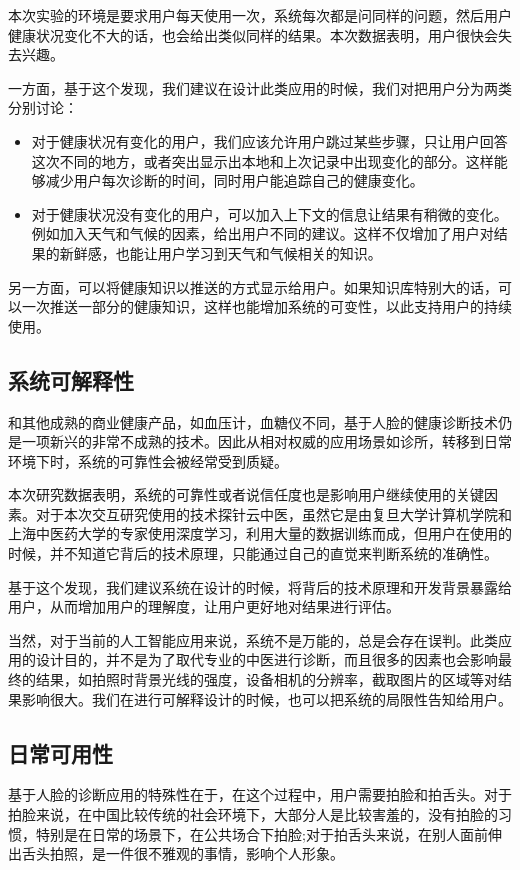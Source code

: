本次实验的环境是要求用户每天使用一次，系统每次都是问同样的问题，然后用户健康状况变化不大的话，也会给出类似同样的结果。本次数据表明，用户很快会失去兴趣。

一方面，基于这个发现，我们建议在设计此类应用的时候，我们对把用户分为两类分别讨论：

\begin{itemize}

    \item 对于健康状况有变化的用户，我们应该允许用户跳过某些步骤，只让用户回答这次不同的地方，或者突出显示出本地和上次记录中出现变化的部分。这样能够减少用户每次诊断的时间，同时用户能追踪自己的健康变化。

    \item 对于健康状况没有变化的用户，可以加入上下文的信息让结果有稍微的变化。例如加入天气和气候的因素，给出用户不同的建议。这样不仅增加了用户对结果的新鲜感，也能让用户学习到天气和气候相关的知识。

\end{itemize}

另一方面，可以将健康知识以推送的方式显示给用户。如果知识库特别大的话，可以一次推送一部分的健康知识，这样也能增加系统的可变性，以此支持用户的持续使用。

\subsection{系统可解释性}

和其他成熟的商业健康产品，如血压计，血糖仪不同，基于人脸的健康诊断技术仍是一项新兴的非常不成熟的技术。因此从相对权威的应用场景如诊所，转移到日常环境下时，系统的可靠性会被经常受到质疑。

本次研究数据表明，系统的可靠性或者说信任度也是影响用户继续使用的关键因素。对于本次交互研究使用的技术探针云中医，虽然它是由复旦大学计算机学院和上海中医药大学的专家使用深度学习，利用大量的数据训练而成，但用户在使用的时候，并不知道它背后的技术原理，只能通过自己的直觉来判断系统的准确性。

基于这个发现，我们建议系统在设计的时候，将背后的技术原理和开发背景暴露给用户，从而增加用户的理解度，让用户更好地对结果进行评估。

当然，对于当前的人工智能应用来说，系统不是万能的，总是会存在误判。此类应用的设计目的，并不是为了取代专业的中医进行诊断，而且很多的因素也会影响最终的结果，如拍照时背景光线的强度，设备相机的分辨率，截取图片的区域等对结果影响很大。我们在进行可解释设计的时候，也可以把系统的局限性告知给用户。

\subsection{日常可用性}
基于人脸的诊断应用的特殊性在于，在这个过程中，用户需要拍脸和拍舌头。对于拍脸来说，在中国比较传统的社会环境下，大部分人是比较害羞的，没有拍脸的习惯，特别是在日常的场景下，在公共场合下拍脸;对于拍舌头来说，在别人面前伸出舌头拍照，是一件很不雅观的事情，影响个人形象。


